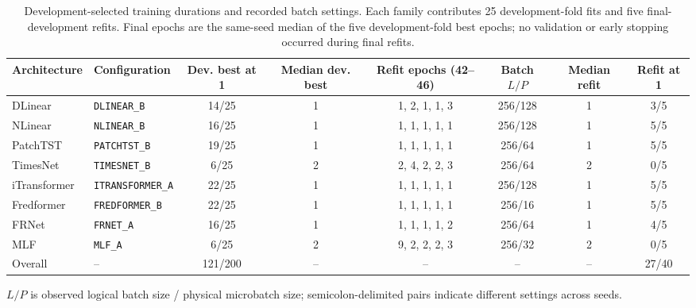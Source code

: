 \begin{table}[t]
\centering
\caption{Development-selected training durations and recorded batch settings. Each family contributes 25 development-fold fits and five final-development refits. Final epochs are the same-seed median of the five development-fold best epochs; no validation or early stopping occurred during final refits.}
\label{tab:repro_refit_metadata}
\scriptsize
\setlength{\tabcolsep}{3pt}
\begin{tabular}{llcccccc}
\hline
Architecture & Configuration & Dev. best at 1 & Median dev. best & Refit epochs (42--46) & Batch $L/P$ & Median refit & Refit at 1 \\ 
\hline
DLinear & \texttt{DLINEAR\_B} & 14/25 & 1 & 1, 2, 1, 1, 3 & 256/128 & 1 & 3/5 \\
NLinear & \texttt{NLINEAR\_B} & 16/25 & 1 & 1, 1, 1, 1, 1 & 256/128 & 1 & 5/5 \\
PatchTST & \texttt{PATCHTST\_B} & 19/25 & 1 & 1, 1, 1, 1, 1 & 256/64 & 1 & 5/5 \\
TimesNet & \texttt{TIMESNET\_B} & 6/25 & 2 & 2, 4, 2, 2, 3 & 256/64 & 2 & 0/5 \\
iTransformer & \texttt{ITRANSFORMER\_A} & 22/25 & 1 & 1, 1, 1, 1, 1 & 256/128 & 1 & 5/5 \\
Fredformer & \texttt{FREDFORMER\_B} & 22/25 & 1 & 1, 1, 1, 1, 1 & 256/16 & 1 & 5/5 \\
FRNet & \texttt{FRNET\_A} & 16/25 & 1 & 1, 1, 1, 1, 2 & 256/64 & 1 & 4/5 \\
MLF & \texttt{MLF\_A} & 6/25 & 2 & 9, 2, 2, 2, 3 & 256/32 & 2 & 0/5 \\
\hline
Overall & -- & 121/200 & -- & -- & -- & -- & 27/40 \\
\hline
\end{tabular}
\par\footnotesize{$L/P$ is observed logical batch size / physical microbatch size; semicolon-delimited pairs indicate different settings across seeds.}
\end{table}
